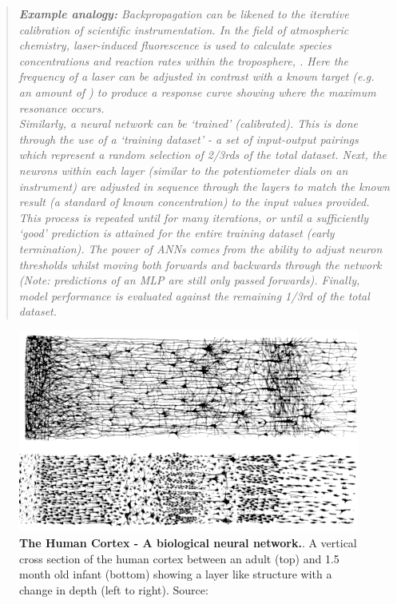 \begin{quote}
\textit{
\textbf{Example analogy:} Backpropagation can be likened to the iterative calibration of scientific instrumentation. In the field of atmospheric chemistry, laser-induced fluorescence is used to calculate species concentrations and reaction rates within the troposphere, \citep{lif1,lif2}. Here the frequency of a laser can be adjusted in contrast with a known target (e.g. an amount of ) to produce a response curve showing where the maximum resonance occurs.\\
Similarly, a neural network can be `trained' (calibrated). 
This is done through the use of a `training dataset' - a set of input-output pairings which represent a random selection of 2/3rds of the total dataset. Next, the neurons within each layer (similar to the potentiometer dials on an instrument) are adjusted in sequence through the layers to match the known result (a standard of known concentration) to the input values provided. This process is repeated until for many iterations, or until a sufficiently `good' prediction is attained for the entire training dataset (early termination). The power of ANNs comes from the ability to adjust neuron thresholds whilst moving both forwards and backwards through the network (Note: predictions of an MLP are still only passed forwards). Finally, model performance is evaluated against the remaining 1/3rd of the total dataset.
}
\end{quote}


\begin{figure}[H]
     \centering
         \includegraphics[width=.85\textwidth]{figures_c3/mlpregressor/Cajal_cortex_drawings.png}
        \caption{\textbf{The Human Cortex - A biological neural network.}. A vertical cross section of the human cortex between an adult (top) and 1.5 month old infant (bottom) showing a layer like structure with a change in depth (left to right). Source: \cite{layercortex}}
        \label{fig:layercortex}
\end{figure}

